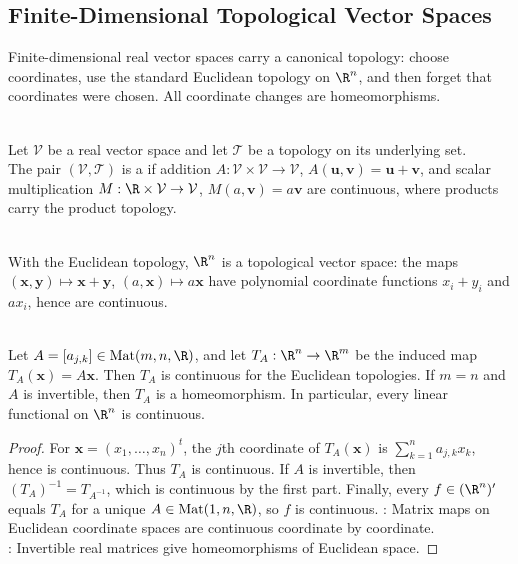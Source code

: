 \subsection{Finite-Dimensional Topological Vector Spaces}

%

Finite-dimensional real vector spaces carry a canonical topology: choose coordinates, use the standard Euclidean topology on $\R^n$, and then forget that coordinates were chosen. All coordinate changes are homeomorphisms.

\begin{definition} \label{def:topological-vector-space} \\
Let $\mathcal{V}$ be a real vector space and let $\mathcal{T}$ be a topology on its underlying set.\\
The pair $(\mathcal{V},\mathcal{T})$ is a  if addition $A:\mathcal{V}\times\mathcal{V}\to\mathcal{V}$, $A(\mathbf{u},\mathbf{v})=\mathbf{u}+\mathbf{v}$, and scalar multiplication $M:\R\times\mathcal{V}\to\mathcal{V}$, $M(a,\mathbf{v})=a\mathbf{v}$ are continuous, where products carry the product topology.
\end{definition}

\begin{example} \label{ex:rn-standard-topological-vector-space} \\
With the Euclidean topology, $\R^n$ is a topological vector space: the maps $(\mathbf{x},\mathbf{y})\longmapsto \mathbf{x}+\mathbf{y}$, $(a,\mathbf{x})\longmapsto a\mathbf{x}$ have polynomial coordinate functions $x_i+y_i$ and $ax_i$, hence are continuous.
\end{example}

\begin{proposition} \label{prop:real-matrix-maps-continuous-homeomorphisms} \\
Let $A=[a_{j,k}]\in\operatorname{Mat}(m,n,\R)$, and let $T_A:\R^n\to\R^m$ be the induced map $T_A(\mathbf{x})=A\mathbf{x}$. Then $T_A$ is continuous for the Euclidean topologies. If $m=n$ and $A$ is invertible, then $T_A$ is a homeomorphism. In particular, every linear functional on $\R^n$ is continuous.
\begin{proof}
For $\mathbf{x}=(x_1,\ldots,x_n)^t$, the $j$th coordinate of $T_A(\mathbf{x})$ is $\sum\limits_{k=1}^n a_{j,k}x_k$, hence is continuous. Thus $T_A$ is continuous. If $A$ is invertible, then $(T_A)^{-1}=T_{A^{-1}}$, which is continuous by the first part. Finally, every $f\in(\R^n)'$ equals $T_A$ for a unique $A\in\operatorname{Mat}(1,n,\R)$, so $f$ is continuous.
: Matrix maps on Euclidean coordinate spaces are continuous coordinate by coordinate.\\
: Invertible real matrices give homeomorphisms of Euclidean space.
\end{proof}
\end{proposition}

